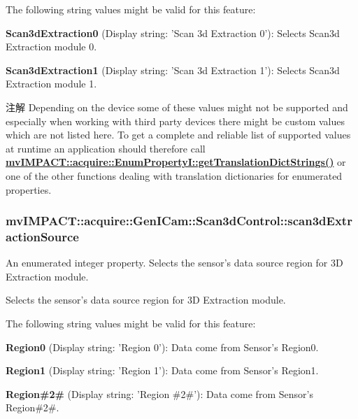 The following string values might be valid for this feature\+:
\begin{DoxyItemize}
\item {\bfseries Scan3d\+Extraction0} (Display string\+: 'Scan 3d Extraction 0')\+: Selects Scan3d Extraction module 0.
\item {\bfseries Scan3d\+Extraction1} (Display string\+: 'Scan 3d Extraction 1')\+: Selects Scan3d Extraction module 1.
\end{DoxyItemize}

\begin{DoxyNote}{注解}
Depending on the device some of these values might not be supported and especially when working with third party devices there might be custom values which are not listed here. To get a complete and reliable list of supported values at runtime an application should therefore call {\bfseries \hyperlink{classmv_i_m_p_a_c_t_1_1acquire_1_1_enum_property_i_a0ba6ccbf5ee69784d5d0b537924d26b6}{mv\+I\+M\+P\+A\+C\+T\+::acquire\+::\+Enum\+Property\+I\+::get\+Translation\+Dict\+Strings()}} or one of the other functions dealing with translation dictionaries for enumerated properties. 
\end{DoxyNote}
\hypertarget{classmv_i_m_p_a_c_t_1_1acquire_1_1_gen_i_cam_1_1_scan3d_control_a68ede1779a64fd607f9d30a8b789875f}{
\subsubsection[{scan3d\+Extraction\+Source}]{ mv\+I\+M\+P\+A\+C\+T\+::acquire\+::\+Gen\+I\+Cam\+::\+Scan3d\+Control\+::scan3d\+Extraction\+Source}}\label{classmv_i_m_p_a_c_t_1_1acquire_1_1_gen_i_cam_1_1_scan3d_control_a68ede1779a64fd607f9d30a8b789875f}


An enumerated integer property. Selects the sensor's data source region for 3\+D Extraction module. 

Selects the sensor's data source region for 3\+D Extraction module.

The following string values might be valid for this feature\+:
\begin{DoxyItemize}
\item {\bfseries Region0} (Display string\+: 'Region 0')\+: Data come from Sensor's Region0.
\item {\bfseries Region1} (Display string\+: 'Region 1')\+: Data come from Sensor's Region1.
\item {\bfseries Region\#2\#} (Display string\+: 'Region \#2\#')\+: Data come from Sensor's Region\#2\#.
\end{DoxyItemize}

